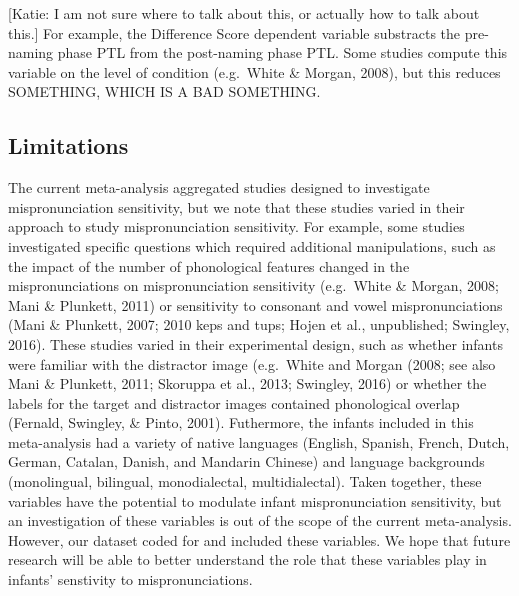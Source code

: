 \documentclass[man]{apa6}
\theoremstyle{definition}
\theoremstyle{definition}
\theoremstyle{definition}
\theoremstyle{remark}
\begin{document}
{[}Katie: I am not sure where to talk about this, or actually how to
talk about this.{]} For example, the Difference Score dependent variable
substracts the pre-naming phase PTL from the post-naming phase PTL. Some
studies compute this variable on the level of condition (e.g.~White \&
Morgan, 2008), but this reduces SOMETHING, WHICH IS A BAD SOMETHING.

\subsection{Limitations}\label{limitations}

The current meta-analysis aggregated studies designed to investigate
mispronunciation sensitivity, but we note that these studies varied in
their approach to study mispronunciation sensitivity. For example, some
studies investigated specific questions which required additional
manipulations, such as the impact of the number of phonological features
changed in the mispronunciations on mispronunciation sensitivity
(e.g.~White \& Morgan, 2008; Mani \& Plunkett, 2011) or sensitivity to
consonant and vowel mispronunciations (Mani \& Plunkett, 2007; 2010 keps
and tups; Hojen et al., unpublished; Swingley, 2016). These studies
varied in their experimental design, such as whether infants were
familiar with the distractor image (e.g.~White and Morgan (2008; see
also Mani \& Plunkett, 2011; Skoruppa et al., 2013; Swingley, 2016) or
whether the labels for the target and distractor images contained
phonological overlap (Fernald, Swingley, \& Pinto, 2001). Futhermore,
the infants included in this meta-analysis had a variety of native
languages (English, Spanish, French, Dutch, German, Catalan, Danish, and
Mandarin Chinese) and language backgrounds (monolingual, bilingual,
monodialectal, multidialectal). Taken together, these variables have the
potential to modulate infant mispronunciation sensitivity, but an
investigation of these variables is out of the scope of the current
meta-analysis. However, our dataset coded for and included these
variables. We hope that future research will be able to better
understand the role that these variables play in infants' senstivity to
mispronunciations.
\end{document}
